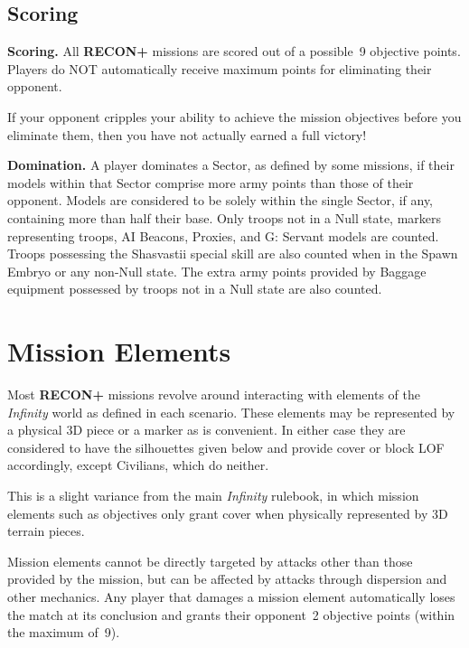 \documentclass[14pt,dvipsnames]{extarticle}
\newcommand{\missionrule}[1]{\noindent\textbf{#1}\xspace}
\newcommand{\reconplus}{\textbf{RECON+}\xspace}
\begin{document}
\subsection{Scoring}

\missionrule{Scoring.}  All \reconplus missions are scored out of a
possible~9 objective points.  Players do NOT automatically receive
maximum points for eliminating their opponent.
  
\begin{recon}
  If your opponent cripples your ability to achieve the mission
  objectives before you eliminate them, then you have not actually
  earned a full victory!
\end{recon}

\missionrule{Domination.}  A player dominates a Sector, as defined by
some missions, if their models within that Sector comprise more army
points than those of their opponent.  Models are considered to be
solely within the single Sector, if any, containing more than half
their base.  Only troops not in a Null state, markers representing
troops, AI Beacons, Proxies, and G: Servant models are counted.
Troops possessing the Shasvastii special skill are also counted when
in the Spawn Embryo or any non-Null state.  The extra army points
provided by Baggage equipment possessed by troops not in a Null state
are also counted.

\section{Mission Elements}

Most \reconplus missions revolve around interacting with elements of
the \emph{Infinity} world as defined in each scenario.  These elements
may be represented by a physical 3D piece or a marker as is
convenient.  In either case they are considered to have the
silhouettes given below and provide cover or block LOF accordingly,
except Civilians, which do neither.

\begin{recon}
  This is a slight variance from the main \emph{Infinity} rulebook, in
  which mission elements such as objectives only grant cover when
  physically represented by 3D terrain pieces.
\end{recon}

Mission elements cannot be directly targeted by attacks other than
those provided by the mission, but can be affected by attacks through
dispersion and other mechanics.  Any player that damages a mission
element automatically loses the match at its conclusion and grants
their opponent~2 objective points (within the maximum of~9).
\end{document}
